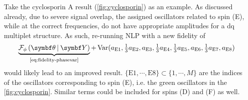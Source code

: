 Take the cyclosporin A result (\cref{fig:cyclosporin}) as an example. As
discussed already, due to severe signal overlap, the assigned oscillators
related to spin (E), while at the correct frequencies, do not have appropriate
amplitudes for a dq multiplet structure. As such, re-running \ac{NLP} with a
new fidelity of
\[
    \underbrace{\FphithY}_{
        \text{\cref{eq:fidelity-phasevar}}
    }+ \Var(
        a_{\text{E}1},
        \tfrac{1}{3} a_{\text{E}2},
        a_{\text{E}3},
        \tfrac{1}{3} a_{\text{E}4},
        \tfrac{1}{3} a_{\text{E}5},
        a_{\text{E}6},
        \tfrac{1}{3} a_{\text{E}7},
        a_{\text{E}8}
    )
\]
would likely lead to an improved result.
$\lbrace \text{E}1, \cdots, \text{E}8 \rbrace \subset \lbrace 1, \cdots, M \rbrace$ are the
indices of the oscillators corresponding to spin (E), i.e. the green
oscillators in the \cref{fig:cyclosporin}. Similar terms could be included
for spins (D) and (F) as well.
